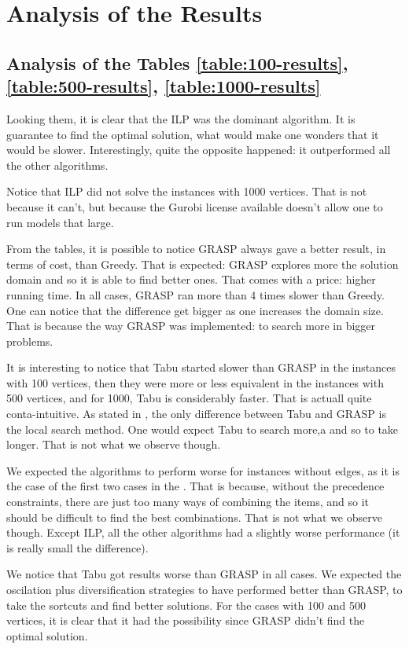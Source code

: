 \section{Analysis of the Results}

\subsection{Analysis of the Tables \ref{table:100-results}, \ref{table:500-results}, \ref{table:1000-results}}

Looking them, it is clear that the ILP was the dominant algorithm. It is guarantee to find the optimal solution, what would make one wonders that it would be slower. Interestingly, quite the opposite happened: it outperformed all the other algorithms.

Notice that ILP did not solve the instances with 1000 vertices. That is not because it can't, but because the Gurobi license available doesn't allow one to run models that large.

From the tables, it is possible to notice GRASP always gave a better result, in terms of cost, than Greedy. That is expected: GRASP explores more the solution domain and so it is able to find better ones. That comes with a price: higher running time. In all cases, GRASP ran more than 4 times slower than Greedy. One can notice that the difference get bigger as one increases the domain size. That is because the way GRASP was implemented: to search more in bigger problems.

It is interesting to notice that Tabu started slower than GRASP in the instances with 100 vertices, then they were more or less equivalent in the instances with 500 vertices, and for 1000, Tabu is considerably faster. That is actuall quite conta-intuitive. As stated in , the only difference between Tabu and GRASP is the local search method. One would expect Tabu to search more,a and so to take longer. That is not what we observe though.

We expected the algorithms to perform worse for instances without edges, as it is the case of the first two cases in the . That is because, without the precedence constraints, there are just too many ways of combining the items, and so it should be difficult to find the best combinations. That is not what we observe though. Except ILP, all the other algorithms had a slightly worse performance (it is really small the difference).

We notice that Tabu got results worse than GRASP in all cases. We expected the oscilation plus diversification strategies to have performed better than GRASP, to take the sortcuts and find better solutions. For the cases with 100 and 500 vertices, it is clear that it had the possibility since GRASP didn't find the optimal solution.

